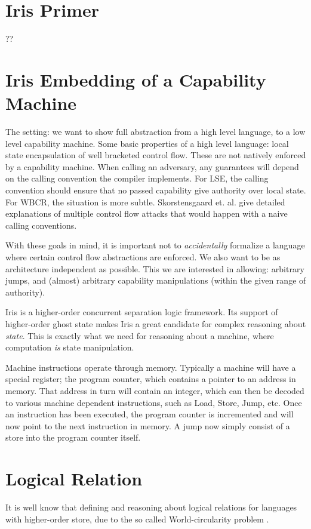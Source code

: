 \documentclass[sigplan,review,anonymous]{acmart}\settopmatter{printfolios=true,printccs=false,printacmref=false}
\begin{document}
\section{Iris Primer}
??

\section{Iris Embedding of a Capability Machine}
The setting: we want to show full abstraction from a high level language, to a low level capability machine. Some basic properties of a high level language: local state encapsulation of well bracketed control flow. These are not natively enforced by a capability machine. When calling an adversary, any guarantees will depend on the calling convention the compiler implements. For LSE, the calling convention should ensure that no passed capability give authority over local state. For WBCR, the situation is more subtle. Skorstensgaard et. al. give detailed explanations of multiple control flow attacks that would happen with a naive calling conventions. 

With these goals in mind, it is important not to \textit{accidentally} formalize a language where certain control flow abstractions are enforced. We also want to be as architecture independent as possible. This we are interested in allowing: arbitrary jumps, and (almost) arbitrary capability manipulations (within the given range of authority). 

Iris is a higher-order concurrent separation logic framework. Its support of higher-order ghost state makes Iris a great candidate for complex reasoning about \textit{state}. This is exactly what we need for reasoning about a machine, where computation \textit{is} state manipulation. 

Machine instructions operate through memory. Typically a machine will have a special register; the program counter, which contains a pointer to an address in memory. That address in turn will contain an integer, which can then be decoded to various machine dependent instructions, such as Load, Store, Jump, etc. Once an instruction has been executed, the program counter is incremented and will now point to the next instruction in memory. A jump now simply consist of a store into the program counter itself. 

\section{Logical Relation}
It is well know that defining and reasoning about logical relations for languages with higher-order store, due to the so called World-circularity problem \cite{amal}. 
\end{document}

